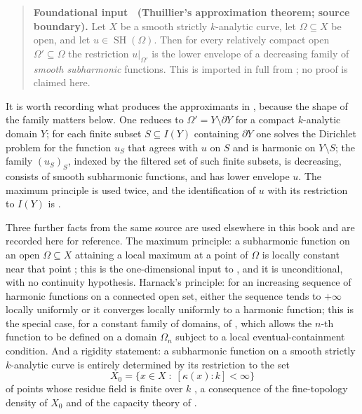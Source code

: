 \label{thm:ch15-thuillier-approximation}
\begin{quote}
\textbf{Foundational input \thetheorem\ (Thuillier's approximation
theorem; source boundary).}
Let $X$ be a smooth strictly $k$-analytic curve, let $\Omega\subseteq X$ be
open, and let $u\in\operatorname{SH}(\Omega)$.  Then for every relatively compact open
$\Omega'\subseteq\Omega$ the restriction $u|_{\Omega'}$ is the lower envelope
of a decreasing family of \emph{smooth subharmonic} functions.
This is imported in full from \cite[Th\'eor\`eme~3.4.2]{Thu05}; no proof
is claimed here.
\end{quote}

It is worth recording what
produces the approximants in , because
the shape of the family matters below.  One reduces to
$\Omega'=Y\setminus\partial Y$ for a compact $k$-analytic domain $Y$; for
each finite subset $S\subseteq I(Y)$ containing $\partial Y$ one solves the
Dirichlet problem for the function $u_S$ that agrees with $u$ on $S$ and is
harmonic on $Y\setminus S$; the family $(u_S)_S$, indexed by the filtered set
of such finite subsets, is decreasing, consists of smooth subharmonic
functions, and has lower envelope $u$.  The maximum principle
\cite[Proposition~3.1.11]{Thu05} is used twice, and the identification of
$u$ with its restriction to $I(Y)$ is \cite[Lemme~3.4.1]{Thu05}.

Three further facts from the same source are used elsewhere in this book and
are recorded here for reference.  The maximum principle: a subharmonic
function on an open $\Omega\subseteq X$ attaining a local maximum at a point
of $\Omega$ is locally constant near that point
\cite[Proposition~3.1.11]{Thu05}; this is the one-dimensional input to
, and it is unconditional, with no continuity
hypothesis.  Harnack's principle: for an increasing sequence of harmonic
functions on a connected open set, either the sequence tends to $+\infty$
locally uniformly or it converges locally uniformly to a harmonic function;
this is the special case, for a constant family of domains, of
\cite[Proposition~3.1.2]{Thu05}, which allows the $n$-th function to be
defined on a domain $\Omega_n$ subject to a local eventual-containment
condition.  And a rigidity statement: a subharmonic
function on a smooth strictly $k$-analytic curve is entirely determined by
its restriction to the set
\begin{equation}
\label{eq:ch15-thuillier-X0}
 X_0=\{x\in X\;:\;[\kappa(x):k]<\infty\}
\end{equation}
of points whose residue field is finite over $k$
\cite[Th\'eor\`eme~3.6.26]{Thu05}, a consequence of the fine-topology
density of $X_0$ \cite[Proposition~3.6.27]{Thu05} and of the capacity theory
of \cite[\S3.6]{Thu05}.


